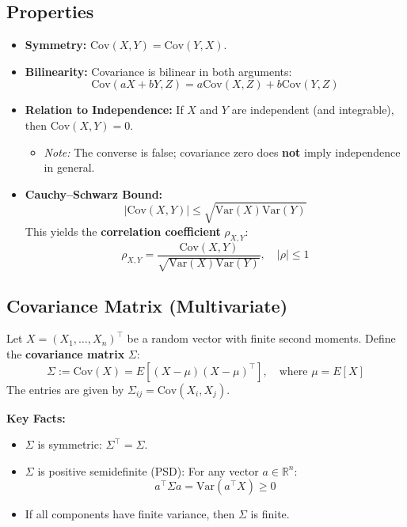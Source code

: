 \documentclass[12pt, a4paper]{report}
\begin{document}
\subsection{Properties}
\begin{itemize}
    \item \textbf{Symmetry:} $\text{Cov}(X, Y) = \text{Cov}(Y, X)$.
    \item \textbf{Bilinearity:} Covariance is bilinear in both arguments:
    \[ \text{Cov}(aX + bY, Z) = a\text{Cov}(X, Z) + b\text{Cov}(Y, Z) \]
    \item \textbf{Relation to Independence:} If $X$ and $Y$ are independent (and integrable), then $\text{Cov}(X, Y) = 0$.
    \begin{itemize}
        \item \textit{Note:} The converse is false; covariance zero does \textbf{not} imply independence in general.
    \end{itemize}
    \item \textbf{Cauchy–Schwarz Bound:}
    \[ |\text{Cov}(X, Y)| \leq \sqrt{\text{Var}(X)\text{Var}(Y)} \]
    This yields the \textbf{correlation coefficient} $\rho_{X,Y}$:
    \[ \rho_{X,Y} = \frac{\text{Cov}(X, Y)}{\sqrt{\text{Var}(X)\text{Var}(Y)}}, \quad |\rho| \leq 1 \]
\end{itemize}

\subsection{Covariance Matrix (Multivariate)}
Let $X = (X_1, \dots, X_n)^\top$ be a random vector with finite second moments. Define the \textbf{covariance matrix} $\Sigma$:
\begin{equation}
    \Sigma := \text{Cov}(X) = E[(X - \mu)(X - \mu)^\top], \quad \text{where } \mu = E[X]
\end{equation}
The entries are given by $\Sigma_{ij} = \text{Cov}(X_i, X_j)$.

\textbf{Key Facts:}
\begin{itemize}
    \item $\Sigma$ is symmetric: $\Sigma^\top = \Sigma$.
    \item $\Sigma$ is positive semidefinite (PSD): For any vector $a \in \mathbb{R}^n$:
    \[ a^\top \Sigma a = \text{Var}(a^\top X) \geq 0 \]
    \item If all components have finite variance, then $\Sigma$ is finite.
\end{itemize}
\end{document}
